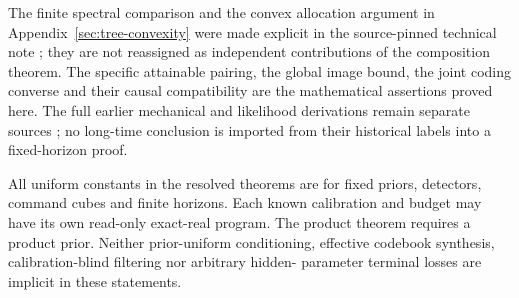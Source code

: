 The finite spectral comparison and the convex allocation argument in
Appendix~\ref{sec:tree-convexity} were made explicit in the source-pinned
technical note \cite{A1v9note}; they are not reassigned as independent
contributions of the composition theorem. The specific attainable
pairing, the global image bound, the joint coding converse and their
causal compatibility are the mathematical assertions proved here.
The full earlier mechanical and likelihood derivations remain separate
sources \cite{A1v5,A1v6,A1round33}; no long-time conclusion is imported
from their historical labels into a fixed-horizon proof.

All uniform constants in the resolved theorems are for fixed priors,
detectors, command cubes and finite horizons. Each known calibration and
budget may have its own read-only exact-real program. The product theorem
requires a product prior. Neither prior-uniform conditioning, effective
codebook synthesis, calibration-blind filtering nor arbitrary hidden-
parameter terminal losses are implicit in these statements.
